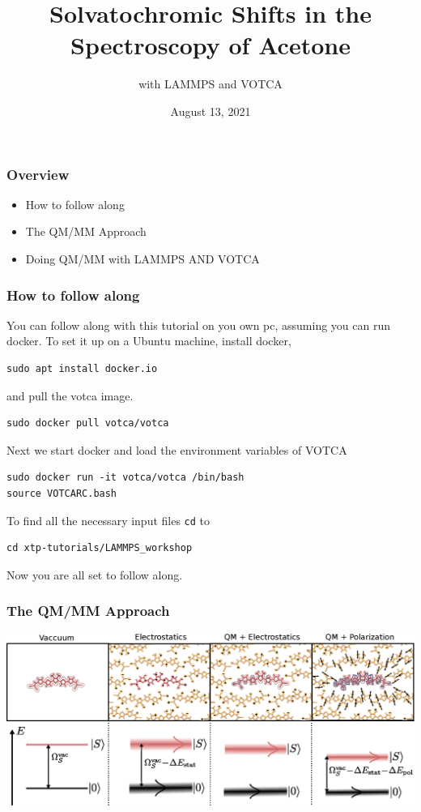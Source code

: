 \documentclass[t,aspectratio=169, 8pt]{beamer}
\title{Solvatochromic Shifts in the Spectroscopy of Acetone}
\subtitle{\Large with LAMMPS and VOTCA}
\author{August 13, 2021}
\begin{document}
\begin{titleframe}[variant=1,bgimage=background.png]
\end{titleframe}

\begin{chapterframe}
  \frametitle{Overview}
  \begin{itemize}
    \item How to follow along
    \item The QM/MM Approach
    \item Doing QM/MM with LAMMPS AND VOTCA
  \end{itemize}
\end{chapterframe}



\begin{frame}[fragile]
  \frametitle{How to follow along}
  You can follow along with this tutorial on you own pc, assuming you can run docker. To set it up on a Ubuntu machine, install docker,
  \begin{verbatim}
sudo apt install docker.io
  \end{verbatim}
  and pull the votca image.
  \begin{verbatim}
sudo docker pull votca/votca
  \end{verbatim}
Next we start docker and load the environment variables of VOTCA
  \begin{verbatim}
sudo docker run -it votca/votca /bin/bash
source VOTCARC.bash
  \end{verbatim}
  To find all the necessary input files \texttt{cd} to 
\begin{verbatim}
cd xtp-tutorials/LAMMPS_workshop
\end{verbatim}
Now you are all set to follow along. 

\end{frame}


\begin{frame}
  \frametitle{The QM/MM Approach}
  \centering
  \includegraphics[height=0.65\textheight]{images/siteenergies}
\end{frame}
\end{document}
